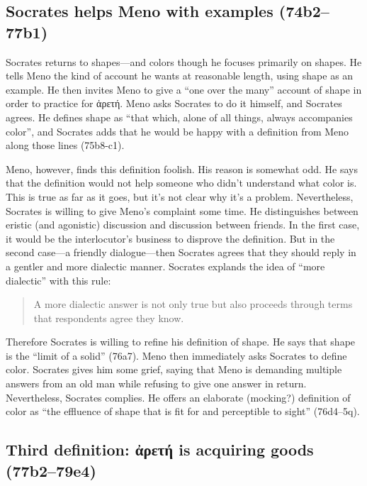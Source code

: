 \documentclass[12pt,letterpaper]{article}
\begin{document}
\subsection{Socrates helps Meno with examples (74b2--77b1)}

Socrates returns to shapes---and colors though he focuses primarily on shapes. He tells Meno the kind of account he wants at reasonable length, using shape as an example. He then invites Meno to give a ``one over the many'' account of shape in order to practice for \textgreek{ἀρετή}. Meno asks Socrates to do it himself, and Socrates agrees. He defines shape as ``that which, alone of all things, always accompanies color'', and Socrates adds that he would be happy with a definition from Meno along those lines (75b8-c1).

Meno, however, finds this definition foolish. His reason is somewhat odd. He says that the definition would not help someone who didn't understand what color is. This is true as far as it goes, but it's not clear why it's a problem. Nevertheless, Socrates is willing to give Meno's complaint some time. He distinguishes between eristic (and agonistic) discussion and discussion between friends. In the first case, it would be the interlocutor's business to disprove the definition. But in the second case---a friendly dialogue---then Socrates agrees that they should reply in a gentler and more dialectic manner. Socrates explands the idea of ``more dialectic'' with this rule:

\begin{quote}
    A more dialectic answer is not only true but also proceeds through terms that respondents agree they know.
\end{quote}

Therefore Socrates is willing to refine his definition of shape. He says that shape is the ``limit of a solid'' (76a7). Meno then immediately asks Socrates to define color. Socrates gives him some grief, saying that Meno is demanding multiple answers from an old man while refusing to give one answer in return. Nevertheless, Socrates complies. He offers an elaborate (mocking?) definition of color as ``the effluence of shape that is fit for and perceptible to sight'' (76d4--5q).

\subsection{Third definition: \textgreek{ἀρετή} is acquiring goods (77b2--79e4)}
\end{document}
